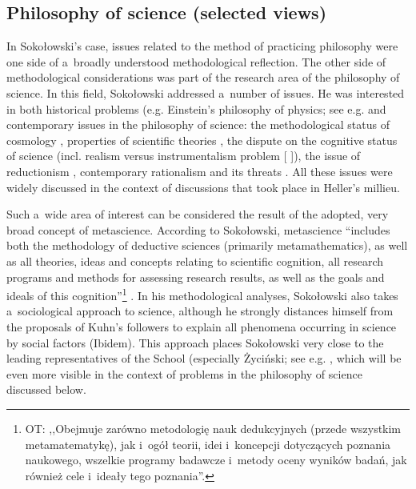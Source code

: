 \subsection{ Philosophy of science (selected views)}



In Sokołowski's case, issues related to the method of practicing philosophy were one side of a~broadly understood methodological reflection. The other side of methodological considerations was part of the research area of the philosophy of science. In this field, Sokołowski addressed a~number of issues. He was interested in both historical problems (e.g. Einstein's philosophy of physics; see e.g. 
\parencites[][]{}[][]{}[][]{} %
 and contemporary issues in the philosophy of science: the methodological status of cosmology 
\parencites[][]{}[][]{}, %
 properties of scientific theories 
\parencites[][]{}[][]{}, %
 the dispute on the cognitive status of science (incl. realism versus instrumentalism problem [
\parencite[][]{}%
]), the issue of reductionism 
\parencites[][]{}[][]{}[][]{}, %
 contemporary rationalism and its threats 
\parencites[][]{}[][]{}. %
 All these issues were widely discussed in the context of discussions that took place in Heller's millieu.



Such a~wide area of interest can be considered the result of the adopted, very broad concept of metascience. According to Sokołowski, metascience ``includes both the methodology of deductive sciences (primarily metamathematics), as well as all theories, ideas and concepts relating to scientific cognition, all research programs and methods for assessing research results, as well as the goals and ideals of this cognition''\footnote{OT: ,,Obejmuje zarówno metodologię nauk dedukcyjnych (przede wszystkim metamatematykę), jak i~ogół teorii, idei i~koncepcji dotyczących poznania naukowego, wszelkie programy badawcze i~metody oceny wyników badań, jak również cele i~ideały tego poznania''.} 
\parencite[][p.57]{}. %
 In his methodological analyses, Sokołowski also takes a~sociological approach to science, although he strongly distances himself from the proposals of Kuhn's followers to explain all phenomena occurring in science by social factors (Ibidem). This approach places Sokołowski very close to the leading representatives of the School (especially Życiński; see e.g. 
\parencite[][]{}, %
 which will be even more visible in the context of problems in the philosophy of science discussed below.



